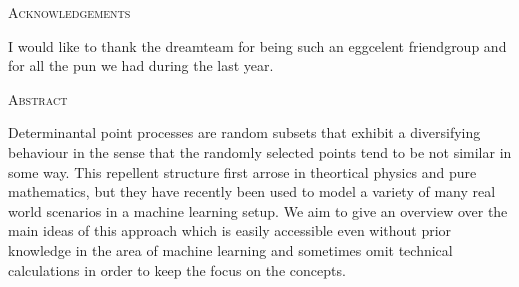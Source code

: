 \begin{center}
{\LARGE\textsc{Acknowledgements}\\[.9cm]}
\begin{minipage}{11cm}
I would like to thank the dreamteam for being such an eggcelent friendgroup and for all the pun we had during the last year.
\end{minipage}
\end{center}

\clearpage


\begin{center}
{\LARGE\textsc{Abstract}\\[.9cm]}
\begin{minipage}{11cm}
Determinantal point processes are random subsets that exhibit a diversifying behaviour in the sense that the randomly selected points tend to be not similar in some way. This repellent structure first arrose in theortical physics and pure mathematics, but they have recently been used to model a variety of many real world scenarios in a machine learning setup. We aim to give an overview over the main ideas of this approach which is easily accessible even without prior knowledge in the area of machine learning and sometimes omit technical calculations in order to keep the focus on the concepts.
\end{minipage}
\end{center}

\clearpage
